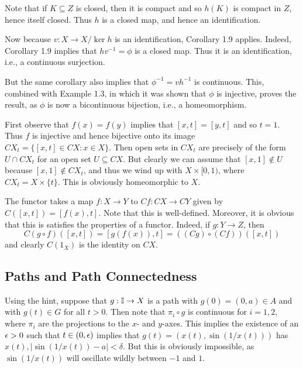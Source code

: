 \documentclass[../../solutions.tex]{subfiles}
\begin{document}
\begin{exercise} \leavevmode
Note that if $K\subseteq Z$ is closed, then it is compact and so $h(K)$ is compact in $Z$, hence itself closed. Thus $h$ is a closed map, and hence an identification. 

Now because $v:X\to X/\ker h$ is an identification, Corollary 1.9 applies. Indeed, Corollary 1.9 implies that $hv^{-1}=\phi$ is a closed map. Thus it is an identification, i.e., a continuous surjection. 

But the same corollary also implies that $\phi^{-1}=vh^{-1}$ is continuous. This, combined with Example 1.3, in which it was shown that $\phi$ is injective, proves the result, as $\phi$ is now a bicontinuous bijection, i.e., a homeomorphism. 
\end{exercise} 

\begin{exercise} \leavevmode
First observe that $f(x)=f(y)$ implies that $[x,t]=[y,t]$ and so $t=1$. Thus $f$ is injective and hence bijective onto its image $CX_t=\{[x,t]\in CX:x\in X\}$. Then open sets in $CX_t$ are precisely of the form $U\cap CX_t$ for an open set $U\subseteq CX$. But clearly we can assume that $[x,1]\not\in U$ because $[x,1]\not\in CX_t$, and thus we wind up with $X\times[0,1)$, where $CX_t=X\times\{t\}$. This is obviously homeomorphic to $X$. 
\end{exercise} 

\begin{exercise} \leavevmode
The functor takes a map $f:X\to Y$ to $Cf:CX\to CY$ given by $C([x,t])=[f(x),t]$. Note that this is well-defined. Moreover, it is obvious that this is satisfies the properties of a functor. Indeed, if $g:Y\to Z$, then \[C(g\circ f)([x,t])=[g(f(x)),t]=((Cg)\circ(Cf))([x,t])\] and clearly $C(1_X)$ is the identity on $CX$. 
\end{exercise} 

\subsection{Paths and Path Connectedness} 
\begin{exercise} \leavevmode
Using the hint, suppose that $g:\mathbb I\to X$ is a path with $g(0)=(0,a)\in A$ and with $g(t)\in G$ for all $t>0$. Then note that $\pi_i\circ g$ is continuous for $i=1,2$, where $\pi_i$ are the projections to the $x$- and $y$-axes. This implies the existence of an $\epsilon>0$ such that $t\in(0,\epsilon)$ implies that $g(t)=(x(t),\sin(1/x(t)))$ has $x(t),|\sin(1/x(t))-a|<\delta$. But this is obviously impossible, as $\sin(1/x(t))$ will oscillate wildly between $-1$ and $1$. 
\end{exercise} 
\end{document}
